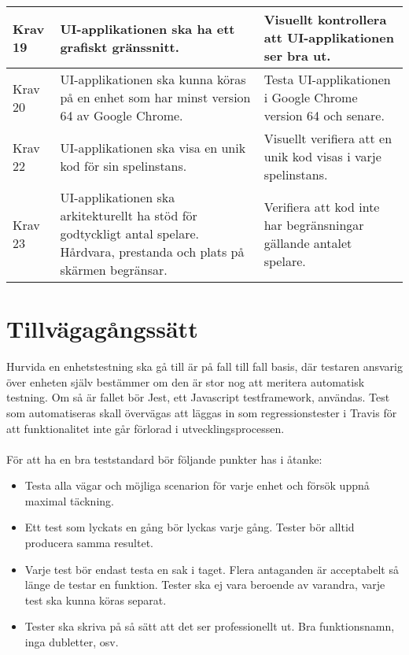 \begin{tabular}{| p{1.5cm} | p{6cm} | p{8cm}|}
		\hline
		Krav 19& UI-applikationen ska ha ett grafiskt gränssnitt. &Visuellt kontrollera att UI-applikationen ser bra ut.\\
		\hline
		Krav 20& UI-applikationen ska kunna köras på en enhet som har minst version 64 av Google Chrome. &Testa UI-applikationen i Google Chrome version 64 och senare. \\
		\hline
		Krav 22& UI-applikationen ska visa en unik kod för sin spelinstans. &Visuellt verifiera att en unik kod visas i varje spelinstans.\\
		\hline
		Krav 23& UI-applikationen ska arkitekturellt ha stöd för godtyckligt antal spelare. Hårdvara, prestanda och plats på skärmen begränsar. &Verifiera att kod inte har begränsningar gällande antalet spelare. \\
		\hline



  \end{tabular}


\section{Tillvägagångssätt}
	Hurvida en enhetstestning ska gå till är på fall till fall basis, där testaren ansvarig över enheten själv bestämmer om den är stor nog att meritera automatisk testning.
	Om så är fallet bör Jest, ett Javascript testframework, användas. Test som automatiseras skall övervägas att läggas in som regressionstester i Travis för att funktionalitet inte går förlorad i utvecklingsprocessen. \\
	\\
	För att ha en bra teststandard bör följande punkter has i åtanke:
	\begin {itemize}[leftmargin=2cm]
	 \item [Genomgående] Testa alla vägar och möjliga scenarion för varje enhet och försök uppnå maximal täckning.
	 \item [Repeterbar] Ett test som lyckats en gång bör lyckas varje gång. Tester bör alltid producera samma resultet.
	 \item [Oberoende] Varje test bör endast testa en sak i taget. Flera antaganden är acceptabelt så länge de testar en funktion. Tester ska ej vara beroende av varandra, varje test ska kunna köras separat.
	 \item [Kodstandard] Tester ska skriva på så sätt att det ser professionellt ut. Bra funktionsnamn, inga dubletter, osv.
	\end {itemize}



